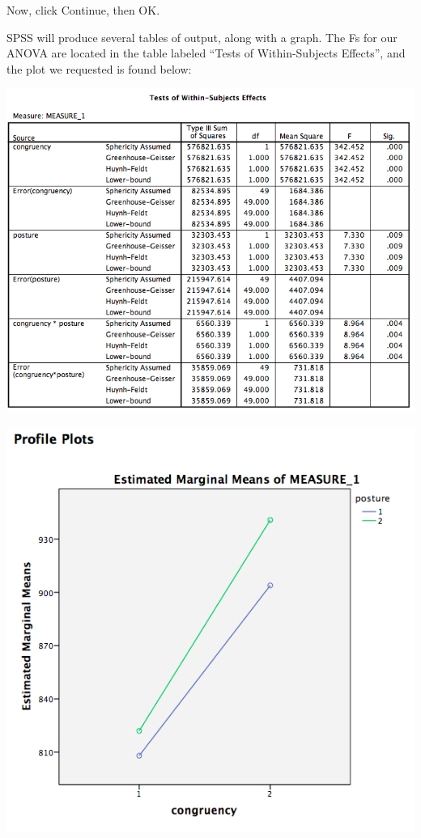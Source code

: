 \documentclass[
]{book}
\begin{document}
Now, click {Continue}, then {OK}.

SPSS will produce several tables of output, along with a graph. The Fs for our ANOVA are located in the table labeled ``Tests of Within-Subjects Effects'', and the plot we requested is found below:

\includegraphics{img/10.4.30.png}

\includegraphics{img/10.4.31.png}
\end{document}

